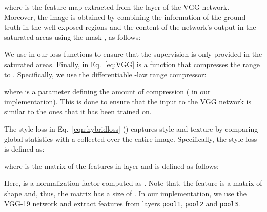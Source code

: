 \vspace{-5pt}

\vspace{-5pt}

\noindent where  is the feature map extracted from the  layer of the VGG network. Moreover, the image  is obtained by combining the information of the ground truth  in the well-exposed regions and the content of the network's output  in the saturated areas using the mask , as follows:

\vspace{-6pt}

\vspace{-6pt}

We use  in our loss functions to ensure that the supervision is only provided in the saturated areas. Finally,  in Eq.~\ref{eq:VGG} is a function that compresses the range to . Specifically, we use the differentiable -law range compressor:

\vspace{-5pt}

\vspace{-5pt}

\noindent where  is a parameter defining the amount of compression ( in our implementation). This is done to ensure that the input to the VGG network is similar to the ones that it has been trained on. 

The style loss in Eq.~\ref{eqn:hybridloss} () captures style and texture by comparing global statistics with a  collected over the entire image. Specifically, the style loss is defined as:

\vspace{-5pt}

\vspace{-5pt}

\noindent where  is the  matrix of the features in layer  and is defined as follows:

\vspace{-10pt}

\vspace{-10pt}

\noindent Here,  is a normalization factor computed as . Note that, the feature  is a matrix of shape  and, thus, the  matrix has a size of . In our implementation, we use the VGG-19 \cite{simonyan2014very} network and extract features from layers \texttt{pool1}, \texttt{pool2} and \texttt{pool3}. 



